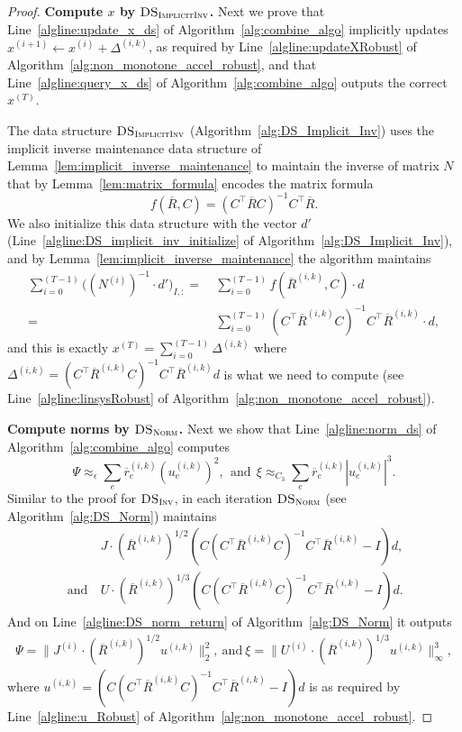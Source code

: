 \documentclass[11pt]{article}
\newcommand\dd{\boldsymbol{\mathit{d}}}
\newcommand\rr{\boldsymbol{\mathit{r}}}
\newcommand\uu{\boldsymbol{\mathit{u}}}
\newcommand\xx{\boldsymbol{\mathit{x}}}
\newcommand\CC{\boldsymbol{\mathit{C}}}
\newcommand\II{\boldsymbol{\mathit{I}}}
\newcommand\JJ{\boldsymbol{\mathit{J}}}
\newcommand\NN{\boldsymbol{\mathit{N}}}
\newcommand\RR{\boldsymbol{\mathit{R}}}
\newcommand\UU{\boldsymbol{\mathit{U}}}
\newcommand{\ov}{\overline}
\begin{document}
\begin{proof}
{\bf Compute $\xx$ by $\textsc{DS}_{\textsc{ImplicitInv}}$.} Next we prove that Line~\ref{algline:update_x_ds} of Algorithm~\ref{alg:combine_algo} implicitly updates $\xx^{(i+1)} \gets \xx^{(i)} + \Delta^{(i,k)}$, as required by Line~\ref{algline:updateXRobust} of Algorithm~\ref{alg:non_monotone_accel_robust}, and that Line~\ref{algline:query_x_ds} of Algorithm~\ref{alg:combine_algo} outputs the correct $\xx^{(T)}$.

The data structure $\textsc{DS}_{\textsc{ImplicitInv}}$ (Algorithm~\ref{alg:DS_Implicit_Inv}) uses the implicit inverse maintenance data structure of Lemma~\ref{lem:implicit_inverse_maintenance} to maintain the inverse of matrix $\NN$ that by Lemma~\ref{lem:matrix_formula} encodes the matrix formula
\[
f(\ov{\RR}, \CC) = (\CC^{\top} \ov{\RR} \CC)^{-1} \CC^{\top} \ov{\RR}.
\]
We also initialize this data structure with the vector $\dd'$ (Line~\ref{algline:DS_implicit_inv_initialize} of Algorithm~\ref{alg:DS_Implicit_Inv}), and by Lemma~\ref{lem:implicit_inverse_maintenance} the algorithm maintains 
\begin{align*}
\sum_{i=0}^{(T-1)} \Big((\NN^{(i)})^{-1} \cdot \dd'\Big)_{I,:} = &~ \sum_{i=0}^{(T-1)} f(\ov{\RR}^{(i,k)}, \CC) \cdot \dd \\
= &~ \sum_{i=0}^{(T-1)} (\CC^{\top} \ov{\RR}^{(i,k)} \CC)^{-1} \CC^{\top} \ov{\RR}^{(i,k)} \cdot \dd,
\end{align*}
and this is exactly $\xx^{(T)} = \sum_{i=0}^{(T-1)} \Delta^{(i,k)}$ where $\Delta^{(i,k)} = (\CC^{\top} \ov{\RR}^{(i,k)} \CC)^{-1} \CC^{\top} \ov{\RR}^{(i,k)} \dd$ is what we need to compute (see Line~\ref{algline:linsysRobust} of Algorithm~\ref{alg:non_monotone_accel_robust}).


{\bf Compute norms by $\textsc{DS}_{\textsc{Norm}}$.} Next we show that Line~\ref{algline:norm_ds} of Algorithm~\ref{alg:combine_algo} computes
\[
\Psi \approx_{\epsilon} \sum_e \ov{\rr}^{(i,k)}_e (\uu^{(i,k)}_e)^2, ~~\text{and}~~ \xi \approx_{C_3} \sum_e \ov{\rr}_e^{(i,k)} |\uu^{(i,k)}_e|^3.
\]
Similar to the proof for $\textsc{DS}_{\textsc{Inv}}$, in each iteration $\textsc{DS}_{\textsc{Norm}}$ (see Algorithm~\ref{alg:DS_Norm}) maintains
\begin{align*}
&~ \JJ \cdot (\ov{\RR}^{(i,k)})^{1/2} (\CC (\CC^{\top} \ov{\RR}^{(i,k)} \CC)^{-1} \CC^{\top} \ov{\RR}^{(i,k)} - \II) \dd, \\
~ \text{and} &~ \UU \cdot (\ov{\RR}^{(i,k)})^{1/3} (\CC (\CC^{\top} \ov{\RR}^{(i,k)} \CC)^{-1} \CC^{\top} \ov{\RR}^{(i,k)} - \II) \dd.
\end{align*}
And on Line~\ref{algline:DS_norm_return} of Algorithm~\ref{alg:DS_Norm} it outputs
\begin{align*}
\Psi = \|\JJ^{(i)} \cdot (\ov{\RR}^{(i,k)})^{1/2} \uu^{(i,k)} \|_2^2, ~
\text{and}~\xi = \|\UU^{(i)} \cdot (\ov{\RR}^{(i,k)})^{1/3} \uu^{(i,k)}\|_{\infty}^3,
\end{align*}
where $\uu^{(i,k)} = (\CC (\CC^{\top} \ov{\RR}^{(i,k)} \CC)^{-1} \CC^{\top} \ov{\RR}^{(i,k)} - \II) \dd$ is as required by Line~\ref{algline:u_Robust} of Algorithm~\ref{alg:non_monotone_accel_robust}.


\end{proof}
\end{document}
